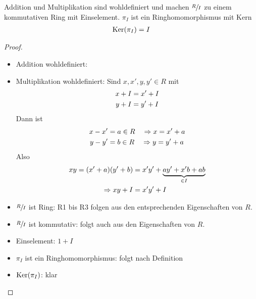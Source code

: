 \begin{proposition}
	Addition und Multiplikation sind wohldefiniert und machen $\sfrac{R}{I}$ zu einem kommutativen Ring mit Einselement. $\pi_I$ ist ein Ringhomomorphismus mit Kern
	\begin{align}
		\operatorname{Ker}(\pi_I) = I\notag
	\end{align}
\end{proposition}
\begin{proof}
	\begin{itemize}
		\item Addition wohldefiniert: 
		\item Multiplikation wohldefiniert: Sind $x,x',y,y'\in R$ mit
		\begin{align}
			x+I &= x'+I\notag \\
			y+I &= y'+I\notag
		\end{align}
		Dann ist
		\begin{align}
			x-x' &= a\in R \quad\Rightarrow x = x'+a\notag \\
			y-y' &= b\in R \quad\Rightarrow y = y'+a\notag
		\end{align}
		Also
		\begin{align}
			xy = (x'+a)(y'+b) &= x'y'+\underbrace{ay'+x'b+ab}_{\in I}\notag \\
			\Rightarrow xy+I &= x'y'+I\notag
		\end{align}
		\item $\sfrac{R}{I}$ ist Ring: R1 bis R3 folgen aus den entsprechenden Eigenschaften von $R$.
		\item $\sfrac{R}{I}$ ist kommutativ: folgt auch aus den Eigenschaften von $R$.
		\item Einselement: $1+I$
		\item $\pi_I$ ist ein Ringhomomorphismus: folgt nach Definition
		\item $\operatorname{Ker}(\pi_I)$: klar
	\end{itemize}
\end{proof}

